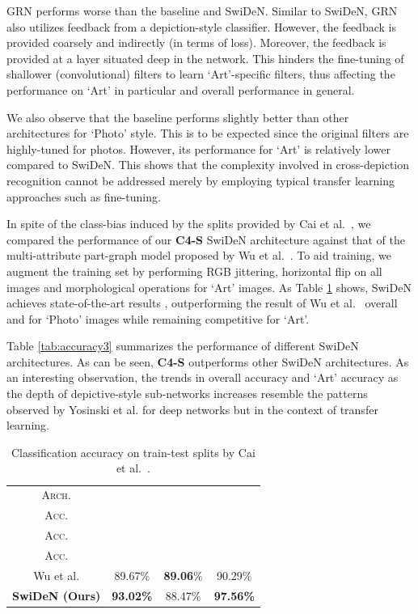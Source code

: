 \documentclass[preprint]{sig-alternate-05-2015}
\begin{document}
GRN performs worse than the baseline and SwiDeN. Similar to SwiDeN, GRN also utilizes feedback from a depiction-style classifier. However, the feedback is provided coarsely and indirectly (in terms of loss). Moreover, the feedback is provided at a layer situated deep in the network. This hinders the fine-tuning of shallower (convolutional) filters to learn `Art'-specific filters, thus affecting the performance on `Art' in particular and overall performance in general.

We also observe that the baseline performs slightly better than other architectures for `Photo' style. This is to be expected since the original filters are highly-tuned for photos. However, its performance for `Art' is relatively lower compared to SwiDeN. This shows that the complexity involved in cross-depiction recognition cannot be addressed merely by employing typical transfer learning approaches such as fine-tuning.

In spite of the class-bias induced by the splits provided by Cai et al.~\cite{cai2015cross}, we compared the performance of our \textbf{C4-S} SwiDeN architecture against that of the multi-attribute part-graph model proposed by Wu et al.~\cite{wu2014learning}. To aid training, we augment the training set by performing RGB jittering, horizontal flip on all images and morphological operations for `Art' images. As Table \ref{tab:accuracy2} shows, SwiDeN achieves state-of-the-art results , outperforming the result of Wu et al.~\cite{wu2014learning} overall and for `Photo' images while remaining competitive for `Art'.

Table \ref{tab:accuracy3} summarizes the performance of different SwiDeN architectures. As can be seen, \textbf{C4-S} outperforms other SwiDeN architectures. As an interesting observation, the trends in overall accuracy and `Art' accuracy  as the depth of depictive-style sub-networks increases resemble the patterns observed by Yosinski et al.\cite{yosinski2014transferable} for deep networks but in the context of transfer learning. 

\renewcommand{\arraystretch}{1.5}
\begin{table}[!tbp]
\centering
\footnotesize
\begin{tabular}{|c|c|c|c|}
\hline
\textsc{Arch.} & \thead{\textsc{Overall} \\ \textsc{Acc.}} & \thead{\textsc{Art} \\ \textsc{Acc.}} & \thead{\textsc{Photo} \\ \textsc{Acc.}} \\
\hline
\hline 
Wu et al.\cite{wu2014learning} & 89.67\% & \textbf{89.06}\%  & 90.29\% \\
\hline
\textbf{SwiDeN (Ours)} & \textbf{93.02\%} & 88.47\% & \textbf{97.56\%} \\
\hline
\end{tabular}
\caption{Classification accuracy on train-test splits by Cai et al.~\cite{cai2015cross}.}
\label{tab:accuracy2}
\end{table}
\end{document}

